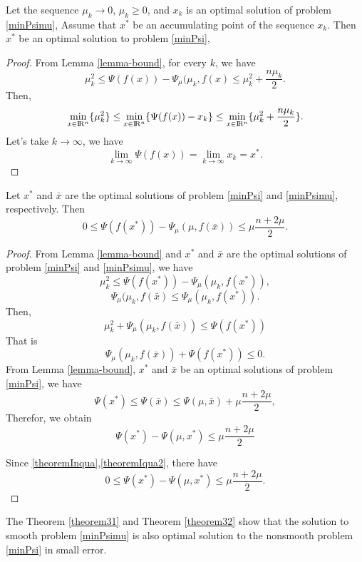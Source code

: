 \documentclass[12pt]{article}
\renewcommand{\Re}{{\rm I}\! {\rm R}}
\newcommand{\rn}{\Re^n}
\begin{document}
\begin{theorem}\label{theorem31}
Let the sequence $\mu_k \rightarrow 0$, $\mu_k \geq 0$, and $x_k$ is an 
optimal solution of problem \eqref{minPsimu}, Assume that $x^*$ be an
accumulating point of the sequence ${x_k}$. Then
$x^*$ be an optimal solution to problem \eqref{minPsi},
\end{theorem}

\begin{proof}
From Lemma \ref{lemma-bound}, for every $k$, we have
$$
\mu_k^2 \leq \Psi(f(x))  - \Psi_\mu(\mu_k,f(x) \leq \mu_k^2 +\frac{n\mu_k}{2}.
$$
Then,
$$
\min_{x\in \rn} \{ \mu_k^2 \} \leq  \min_{x\in \rn} \{ \Psi(f(x))  - x_k \} \leq \min_{x\in \rn} \{ \mu_k^2 +\frac{n\mu_k}{2} \}.
$$
Let's take $k \rightarrow \infty$, we have
$$
\lim_{k \rightarrow \infty}\Psi(f(x))=  \lim_{k \rightarrow \infty}x_k = x^*.
$$
\end{proof}

\begin{theorem} \label{theorem32}
Let $x^*$ and $\bar{x}$ are the optimal solutions of problem \eqref{minPsi}
and \eqref{minPsimu}, respectively.
Then
$$
0 \leq \Psi(f(x^*))  - \Psi_\mu(\mu,f(\bar{x})) \leq \mu\frac{n+2\mu}{2}.
$$
\end{theorem}

\begin{proof}
From Lemma \ref{lemma-bound} and $x^*$ and $\bar{x}$ are the optimal 
solutions of problem \eqref{minPsi} and \eqref{minPsimu}, we have
\[
\mu_k^2 \leq \Psi(f(x^*))  - \Psi_\mu(\mu_k,f(x^*)),
\]
\[
\Psi_\mu(\mu_k,f(\bar{x})  \leq \Psi_\mu(\mu_k,f(x^*)).
\]
Then,
\[
\mu_k^2 + \Psi_\mu(\mu_k,f(\bar{x}))  \leq \Psi(f(x^*))
\]
That is
\begin{equation}\label{theoremInqua}
\Psi_\mu(\mu_k,f(\bar{x}))  + \Psi(f(x^*)) \leq 0.
\end{equation}
From Lemma \ref{lemma-bound}, $x^*$ and $\bar{x}$ be an optimal 
solutions of problem \eqref{minPsi}, we have
\[
\Psi(x^*) \leq \Psi(\bar{x}) \leq \Psi(\mu,\bar{x}) + \mu\frac{n+2\mu}{2},
\]
Therefor, we obtain
\begin{equation}\label{theoremIqua2}
 \Psi(x^*) - \Psi(\mu, x^*)  \leq  \mu\frac{n+2\mu}{2}
\end{equation}

Since \eqref{theoremInqua},\eqref{theoremIqua2}, there have
\[
 0 \leq \Psi(x^*) - \Psi(\mu, x^*)  \leq  \mu\frac{n+2\mu}{2}.
\]
\end{proof}

The Theorem \ref{theorem31} and Theorem \ref{theorem32} show that 
the solution to smooth problem \eqref{minPsimu} is also optimal
solution to the nonsmooth problem \eqref{minPsi} in small error.
\end{document}
